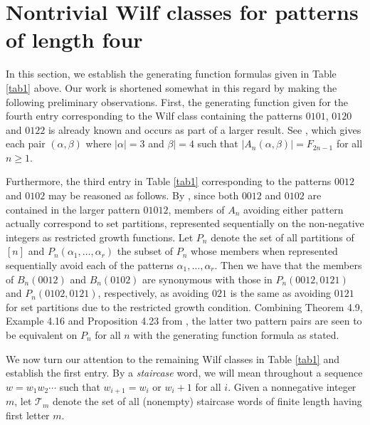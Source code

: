 \documentclass{article}
\theoremstyle{remark}
\theoremstyle{plain}
\begin{document}
\section{Nontrivial Wilf classes for patterns of length four}

In this section, we establish the generating function formulas given in Table \ref{tab1} above.  Our work is shortened somewhat in this regard by making the following preliminary observations.  First, the generating function given for the fourth entry corresponding to the Wilf class containing the patterns $0101$, $0120$ and $0122$ is already known and occurs as part of a larger result. See \cite[Proposition 3.3]{MS2}, which gives each pair $(\alpha,\beta)$ where $|\alpha|=3$ and $\beta|=4$ such that $|A_n(\alpha,\beta)|=F_{2n-1}$ for all $n\geq1$.

Furthermore, the third entry in Table \ref{tab1} corresponding to the patterns $0012$ and $0102$ may be reasoned as follows.  By \cite[Lemma 2.4]{DS}, since both $0012$ and $0102$ are contained in the larger pattern $01012$, members of $A_n$ avoiding either pattern actually correspond to set partitions, represented sequentially on the non-negative integers as restricted growth functions.  Let $P_n$ denote the set of all partitions of $[n]$ and $P_n(\alpha_1,\ldots,\alpha_r)$ the subset of $P_n$ whose members when represented sequentially avoid each of the patterns $\alpha_1,\ldots,\alpha_r$. Then we have that the members of $B_n(0012)$ and $B_n(0102)$ are synonymous with those in $P_n(0012,0121)$ and $P_n(0102,0121)$, respectively, as avoiding $021$ is the same as avoiding $0121$ for set partitions due to the restricted growth condition.  Combining Theorem 4.9, Example 4.16 and Proposition 4.23 from \cite{JMS}, the latter two pattern pairs are seen to be equivalent on $P_n$ for all $n$ with the generating function formula as stated.

We now turn our attention to the remaining Wilf classes in Table \ref{tab1} and establish the first entry. By a \emph{staircase} word, we will mean throughout a sequence $w=w_1w_2\cdots$ such that $w_{i+1}=w_i$ or $w_i+1$ for all $i$.  Given a nonnegative integer $m$, let $\mathcal{T}_m$ denote the set of all (nonempty) staircase words of finite length having first letter $m$.
\end{document}
